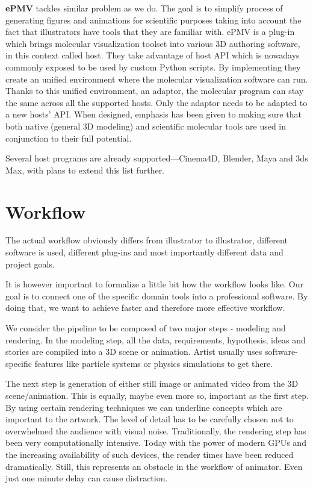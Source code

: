 \documentclass[
  digital, %
  table,   %
  nolof,     %
  nolot,     %
]{fithesis3}
\begin{document}
\textbf{ePMV}\cite{ePMV} tackles similar problem as we do. The goal is to simplify process of generating figures and animations for scientific purposes taking into account the fact that illustrators have tools that they are familiar with. ePMV is a plug-in which brings molecular visualization toolset into various 3D authoring software, in this context called host. They take advantage of host API which is nowadays commonly exposed to be used by custom Python scripts. By implementing they create an unified environment where the molecular visualization software can run. Thanks to this unified environment, an adaptor, the molecular program can stay the same across all the supported hosts. Only the adaptor needs to be adapted to a new hosts' API. When designed, emphasis has been given to making sure that both native (general 3D modeling) and scientific molecular tools are used in conjunction to their full potential.

Several host programs are already supported—Cinema4D, Blender, Maya and 3ds Max, with plans to extend this list further.

\section{Workflow}
The actual workflow obviously differs from illustrator to illustrator, different software is used, different plug-ins and most importantly different data and project goals.

It is however important to formalize a little bit how the workflow looks like. Our goal is to connect one of the specific domain tools into a professional software. By doing that, we want to achieve faster and therefore more effective workflow.

We consider the pipeline to be composed of two major steps - modeling and rendering. In the modeling step, all the data, requirements, hypothesis, ideas and stories are compiled into a 3D scene or animation. Artist usually uses software-specific features like particle systems or physics simulations to get there.

The next step is generation of either still image or animated video from the 3D scene/animation. This is equally, maybe even more so, important as the first step. By using certain rendering techniques we can underline concepts which are important to the artwork. The level of detail has to be carefully chosen not to overwhelmed the audience with visual noise. Traditionally, the rendering step has been very computationally intensive. Today with the power of modern GPUs and the increasing availability of such devices, the render times have been reduced dramatically. Still, this represents an obstacle in the workflow of animator. Even just one minute delay can cause distraction.
\end{document}
